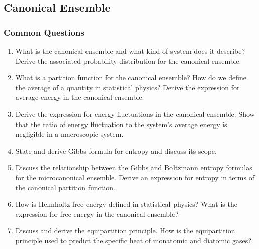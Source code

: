 \documentclass[11pt, a4paper]{article}
\begin{document}
\subsection{Canonical Ensemble}
\subsubsection{Common Questions}
\begin{enumerate}
    \item What is the canonical ensemble and what kind of system does it describe?  Derive the associated probability distribution for the canonical ensemble.

    \item What is a partition function for the canonical ensemble? How do we define the average of a quantity in statistical physics? Derive the expression for average energy in the canonical ensemble.

    \item Derive the expression for energy fluctuations in the canonical ensemble. Show that the ratio of energy fluctuation to the system's average energy is negligible in a macroscopic system.

    \item State and derive Gibbs formula for entropy and discuss its scope.

    \item Discuss the relationship between the Gibbs and Boltzmann entropy formulas for the microcanonical ensemble. Derive an expression for entropy in terms of the canonical partition function.

    \item How is Helmholtz free energy defined in statistical physics? What is the expression for free energy in the canonical ensemble?

    \item Discuss and derive the equipartition principle. How is the equipartition principle used to predict the specific heat of monatomic and diatomic gases?

\end{enumerate}
\end{document}
